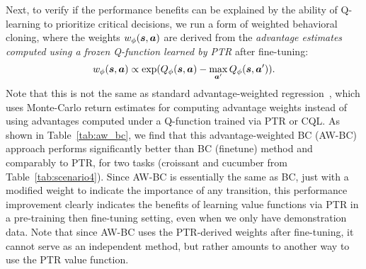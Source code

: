 \begin{table}[h]
\centering
\caption{\footnotesize{\textbf{Performance of advantage-weighted BC} on tasks from Table~\ref{tab:scenario4}. Observe that weighting BC using advantage estimates from the Q-function learned by \ptrmethodname leads to much better performance than standard BC (finetune), almost recovering PTR performance. This test indicates that the Q-function in \ptrmethodname allows us to be accurate on the more critical decisions, thereby preventing the failures of BC.}}
\vspace{-0.2cm}
\label{tab:aw_bc}
\end{table}

Next, to verify if the performance benefits can be explained by the ability of Q-learning to prioritize critical decisions, we run a form of weighted behavioral cloning, where the weights $w_\phi(\boldsymbol{s}, \boldsymbol{a})$ are derived from the \emph{advantage estimates computed using a frozen Q-function learned by PTR} after fine-tuning:
\begin{align*}
    w_\phi(\boldsymbol{s}, \boldsymbol{a})  \propto \exp(Q_\phi(\boldsymbol{s}, \boldsymbol{a}) - \max_{\boldsymbol{a}'} Q_\phi(\boldsymbol{s}, \boldsymbol{a}')).
\end{align*}
Note that this is not the same as standard advantage-weighted regression~\citep{peng2019awr}, which uses Monte-Carlo return estimates for computing advantage weights instead of using advantages computed under a Q-function trained via PTR or CQL. As shown in Table~\ref{tab:aw_bc}, we find that this advantage-weighted BC (AW-BC) approach performs significantly better than BC (finetune) method and comparably to PTR, for two tasks (croissant and cucumber from Table~\ref{tab:scenario4}). Since AW-BC is essentially the same as BC, just with a modified weight to indicate the importance of any transition, this performance improvement clearly indicates the benefits of learning value functions via PTR in a pre-training then fine-tuning setting, even when we only have demonstration data.  Note that since AW-BC uses the PTR-derived weights after fine-tuning, it cannot serve as an independent method, but rather amounts to another way to use the PTR value function.


